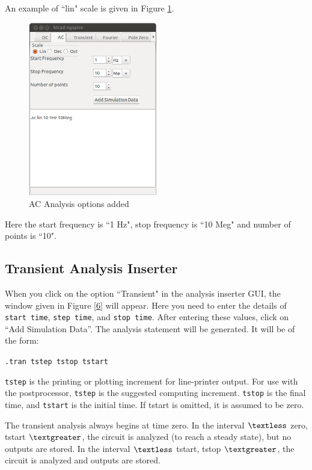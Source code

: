 An example of ``lin" scale is given in Figure \ref{5}.
\begin{figure}[t]
\centering
\includegraphics[width=0.5\textwidth]{figures/5}
\caption{AC Analysis options added}
\label{5}
\end{figure}
Here the start frequency is ``1 Hz", stop frequency is ``10 Meg" and  number of points is ``10".

\subsection{Transient Analysis Inserter}
When you click on the option ``Transient" in the analysis inserter GUI, the window
given in Figure \ref{6} will appear. Here you need to enter the details of {\tt start time}, {\tt step time}, and {\tt stop time}.
After entering these values, click on “Add Simulation Data”. The analysis
statement will be generated. It will be of the form:

{\tt .tran tstep tstop tstart}

{\tt tstep} is the printing or plotting increment for line-printer output. For use with the postprocessor, {\tt tstep} is the suggested computing increment. {\tt tstop} is the final time, and {\tt tstart} is the initial time. If tstart is omitted, it is assumed to be zero.

 The transient analysis always begins at time zero. In the interval $\textless$ zero, tstart $\textgreater$, the circuit is analyzed (to reach a steady state), but no outputs are stored. In the interval $\textless$ tstart, tstop $\textgreater$, the circuit is analyzed and outputs are stored. 

